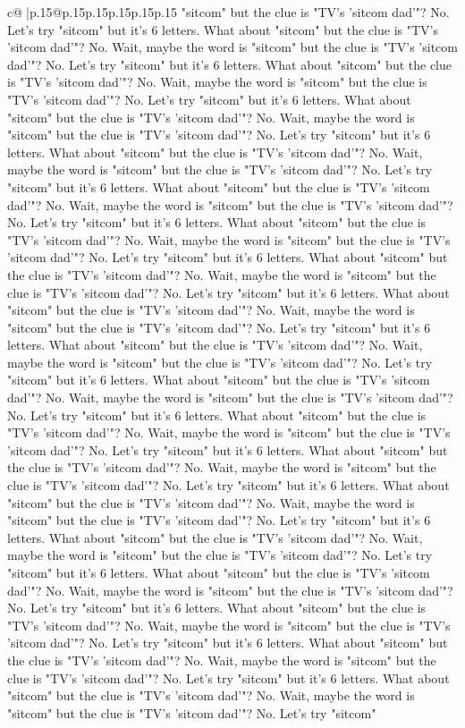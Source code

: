 \documentclass{article}
\begin{document}
{\begin{supertabular}{c@{$\;$}|p{.15\linewidth}@{}p{.15\linewidth}p{.15\linewidth}p{.15\linewidth}p{.15\linewidth}p{.15\linewidth}}
{{{"sitcom" but the clue is "TV's 'sitcom dad'"? No. Let's try "sitcom" but it's 6 letters. What about "sitcom" but the clue is "TV's 'sitcom dad'"? No. Wait, maybe the word is "sitcom" but the clue is "TV's 'sitcom dad'"? No. Let's try "sitcom" but it's 6 letters. What about "sitcom" but the clue is "TV's 'sitcom dad'"? No. Wait, maybe the word is "sitcom" but the clue is "TV's 'sitcom dad'"? No. Let's try "sitcom" but it's 6 letters. What about "sitcom" but the clue is "TV's 'sitcom dad'"? No. Wait, maybe the word is "sitcom" but the clue is "TV's 'sitcom dad'"? No. Let's try "sitcom" but it's 6 letters. What about "sitcom" but the clue is "TV's 'sitcom dad'"? No. Wait, maybe the word is "sitcom" but the clue is "TV's 'sitcom dad'"? No. Let's try "sitcom" but it's 6 letters. What about "sitcom" but the clue is "TV's 'sitcom dad'"? No. Wait, maybe the word is "sitcom" but the clue is "TV's 'sitcom dad'"? No. Let's try "sitcom" but it's 6 letters. What about "sitcom" but the clue is "TV's 'sitcom dad'"? No. Wait, maybe the word is "sitcom" but the clue is "TV's 'sitcom dad'"? No. Let's try "sitcom" but it's 6 letters. What about "sitcom" but the clue is "TV's 'sitcom dad'"? No. Wait, maybe the word is "sitcom" but the clue is "TV's 'sitcom dad'"? No. Let's try "sitcom" but it's 6 letters. What about "sitcom" but the clue is "TV's 'sitcom dad'"? No. Wait, maybe the word is "sitcom" but the clue is "TV's 'sitcom dad'"? No. Let's try "sitcom" but it's 6 letters. What about "sitcom" but the clue is "TV's 'sitcom dad'"? No. Wait, maybe the word is "sitcom" but the clue is "TV's 'sitcom dad'"? No. Let's try "sitcom" but it's 6 letters. What about "sitcom" but the clue is "TV's 'sitcom dad'"? No. Wait, maybe the word is "sitcom" but the clue is "TV's 'sitcom dad'"? No. Let's try "sitcom" but it's 6 letters. What about "sitcom" but the clue is "TV's 'sitcom dad'"? No. Wait, maybe the word is "sitcom" but the clue is "TV's 'sitcom dad'"? No. Let's try "sitcom" but it's 6 letters. What about "sitcom" but the clue is "TV's 'sitcom dad'"? No. Wait, maybe the word is "sitcom" but the clue is "TV's 'sitcom dad'"? No. Let's try "sitcom" but it's 6 letters. What about "sitcom" but the clue is "TV's 'sitcom dad'"? No. Wait, maybe the word is "sitcom" but the clue is "TV's 'sitcom dad'"? No. Let's try "sitcom" but it's 6 letters. What about "sitcom" but the clue is "TV's 'sitcom dad'"? No. Wait, maybe the word is "sitcom" but the clue is "TV's 'sitcom dad'"? No. Let's try "sitcom" but it's 6 letters. What about "sitcom" but the clue is "TV's 'sitcom dad'"? No. Wait, maybe the word is "sitcom" but the clue is "TV's 'sitcom dad'"? No. Let's try "sitcom" but it's 6 letters. What about "sitcom" but the clue is "TV's 'sitcom dad'"? No. Wait, maybe the word is "sitcom" but the clue is "TV's 'sitcom dad'"? No. Let's try "sitcom" but it's 6 letters. What about "sitcom" but the clue is "TV's 'sitcom dad'"? No. Wait, maybe the word is "sitcom" but the clue is "TV's 'sitcom dad'"? No. Let's try "sitcom" but it's 6 letters. What about "sitcom" but the clue is "TV's 'sitcom dad'"? No. Wait, maybe the word is "sitcom" but the clue is "TV's 'sitcom dad'"? No. Let's try "sitcom" }}}
\end{supertabular}}
\end{document}
